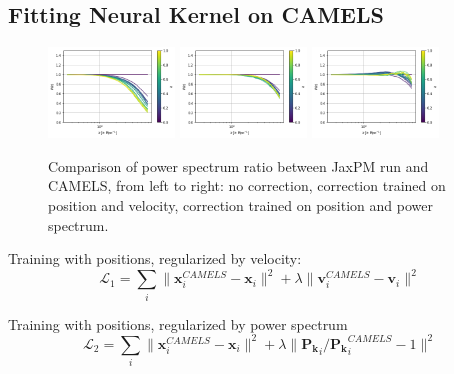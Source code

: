 \documentclass[fleqn,usenatbib]{mnras}
\newcommand{\nblink}[1]{\href{https://github.com/DifferentiableUniverseInitiative/jaxpm-paper/blob/main/notebooks/#1.ipynb}{\faFileCodeO}}
\begin{document}
\subsection{Fitting Neural Kernel on CAMELS}

\begin{figure}
    \centering
    \includegraphics[width=0.3\textwidth]{figures/camels_residuals_nocorrection.png}
    \includegraphics[width=0.3\textwidth]{figures/camels_residuals_vel_pos.png}
    \includegraphics[width=0.3\textwidth]{figures/camels_residuals_pk_pos.png}
    \caption{Comparison of power spectrum ratio between JaxPM run and CAMELS, from left to right: no correction, correction trained on position and velocity, correction trained on position and power spectrum. \nblink{CAMELS_Fitting_PosVel}}
    \label{fig:training_residuals}
\end{figure}

Training with positions, regularized by velocity:
\begin{equation}
    \mathcal{L}_1 = \sum_{i} \| \mathbf{x}^{CAMELS}_i - \mathbf{x}_i  \|^2 + \lambda \| \mathbf{v}^{CAMELS}_i - \mathbf{v}_i  \|^2
\end{equation}


Training with positions, regularized by power spectrum
\begin{equation}
    \mathcal{L}_2 = \sum_{i} \| \mathbf{x}^{CAMELS}_i - \mathbf{x}_i  \|^2 + \lambda \|  \mathbf{P_k}_i/\mathbf{P_k}^{CAMELS}_i  - 1  \|^2
\end{equation}
\end{document}

